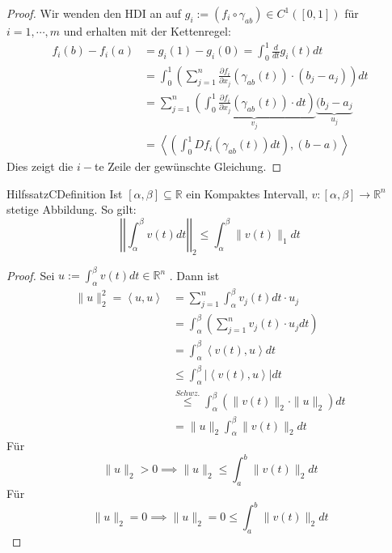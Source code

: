 \begin{proof}
	Wir wenden den HDI an auf $ g_{i}:= \left( f_i \circ \gamma_{ab} \right) \in C^{1}\left( [0,1] \right)$ für $ i = 1 , \cdots, m $ und
	erhalten mit der Kettenregel: 
	\begin{align*}
		f_i(b) - f_i(a) &= g_i(1) - g_i(0) = \int_{ 0 }^{ 1 } \frac{d}{dt} g_i(t) dt \\
						&=  \int_{ 0 }^{ 1 } \left( \sum_{j = 1}^{n} \frac{\partial f_i}{\partial x_j} ( \gamma_{ab}(t))
						\cdot (b_j - a_j)\right) dt \\
						&= \sum_{j=1}^{n} \underbrace{\left( \int_{ 0 }^{ 1 } \frac{\partial f_i}{\partial x_j} 
								\left( \gamma _{ab}(t) \right) \cdot
						dt \right)}_{v_j} \underbrace{ (b_j - a_j}_{u_j} \\
						&=  \left< \left( \int_{ 0 }^{ 1 } Df_i ( \gamma_{ab}(t)) dt \right) , (b-a) \right>
	\end{align*}
	Dies zeigt die $ i- $te Zeile der gewünschte Gleichung. 
\end{proof}

\begin{ibox}[]{Hilfssatz}{CDefinition}
    Ist $ \left[ \alpha , \beta  \right] \subseteq \mathbb{R}  $ ein Kompaktes Intervall, $ v : \left[ \alpha , \beta 
	\right] \to \mathbb{R}^n  $ stetige Abbildung. So gilt: 
	$$ \left| \left|  \int_{ \alpha }^{ \beta } v(t) dt  \right|  \right| _{2} \leq \int_{ \alpha }^{ \beta } \|v(t)\|_{1} dt $$
\end{ibox}
\begin{proof}
	Sei $ u := \int_{ \alpha }^{ \beta } v(t) dt \in \mathbb{R}^n  $ . Dann ist 
\begin{align*}
	\| u \|_{2}^{2} = \left<u,u \right> &= \sum_{j=1}^{n} \int_{ \alpha }^{ \beta } v_j(t) dt \cdot u_j\\
	&= \int_{ \alpha  }^{ \beta  } \left( \sum_{j = 1}^{n}v_j(t) \cdot u_j dt \right) \\
	&=  \int_{ \alpha  }^{ \beta  } \left<v(t), u \right> dt \\
  & \leq \int_{ \alpha  }^{ \beta } \left| \left<v(t),u\right> \right| dt \\
  & \stackrel{Schwz.}{ \leq } \int_{ \alpha  }^{ \beta  } \left( \| v(t) \|_{2} \cdot \|u \|_{2} \right) dt \\
  &=  \|u \|_{2} \int_{ \alpha  }^{ \beta  } \|v(t) \|_{2}dt
\end{align*}
Für
$$
\|u \|_{2} > 0 \implies \|u \|_{2} \leq  \int_{ a }^{ b } \|v(t) \|_{2} dt
$$
Für
$$
\|u \|_{2} = 0 \implies \|u \|_{2} = 0 \leq  \int_{ a }^{ b } \|v(t) \|_{2} dt
$$
\end{proof}

